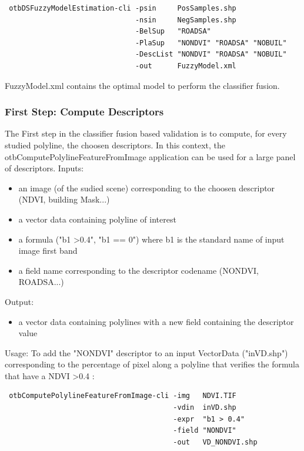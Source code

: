 \begin{verbatim}
 otbDSFuzzyModelEstimation-cli -psin     PosSamples.shp 
                               -nsin     NegSamples.shp 
                               -BelSup   "ROADSA" 
                               -PlaSup   "NONDVI" "ROADSA" "NOBUIL" 
                               -DescList "NONDVI" "ROADSA" "NOBUIL" 
                               -out      FuzzyModel.xml
\end{verbatim}

FuzzyModel.xml contains the optimal model to perform the classifier fusion.

\subsubsection{First Step: Compute Descriptors}

The First step in the classifier fusion based validation is to compute, for every studied polyline, the choosen descriptors. In this context, the otbComputePolylineFeatureFromImage application can be used for a large panel of descriptors.
Inputs:
\begin{itemize}
\item an image (of the sudied scene) corresponding to the choosen descriptor (NDVI, building Mask...)
\item a vector data containing polyline of interest
\item a formula ("b1 \textgreater 0.4", "b1 == 0") where b1 is the standard name of input image first band
\item a field name corresponding to the descriptor codename (NONDVI, ROADSA...)
\end{itemize}
Output:
\begin{itemize}
\item a vector data containing polylines with a new field containing the descriptor value
\end{itemize}
Usage: To add the "NONDVI" descriptor to an input VectorData ("inVD.shp") corresponding to the percentage of pixel along a polyline that verifies the formula that have a NDVI \textgreater 0.4 :

\begin{verbatim}
 otbComputePolylineFeatureFromImage-cli -img   NDVI.TIF 
                                        -vdin  inVD.shp 
                                        -expr  "b1 > 0.4" 
                                        -field "NONDVI" 
                                        -out   VD_NONDVI.shp
\end{verbatim}

